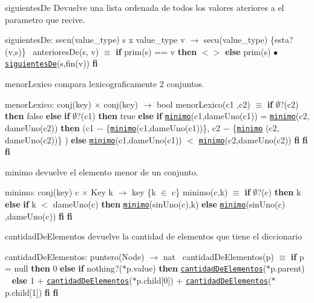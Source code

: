 \begin{DoxyParagraph}{siguientes\+De}
Devuelve una lista ordenada de todos los valores ateriores a el parametro que recive.

siguientes\+De\+: secu(value\+\_\+type) s x value\+\_\+type v $\to$ secu(value\+\_\+type) \{esta?(v,s)\}~\newline
 anteriores\+De(s, v) $\equiv$ {\bfseries if} prim(s) == v {\bfseries then} $<$$>$ {\bfseries else} prim(s) $\bullet$ \href{axiomas.html#siguientesDe}{\tt siguientes\+De}(s,fin(v)) {\bfseries fi} 
\end{DoxyParagraph}


\begin{DoxyParagraph}{menor\+Lexico}
compara lexicograficamente 2 conjuntos.

menor\+Lexico\+: conj(key) $\times$ conj(key) $\to$ bool menor\+Lexico(c1 ,c2) $\equiv$ {\bfseries if} $\emptyset$?(c2) {\bfseries then} false {\bfseries else} {\bfseries if} $\emptyset$?(c1) {\bfseries then} true {\bfseries else} {\bfseries if} \href{axiomas.html#minimo}{\tt minimo}(c1,dame\+Uno(c1)) = \href{axiomas.html#minimo}{\tt minimo}(c2, dame\+Uno(c2)) {\bfseries then} (c1 $-$ \{\href{axiomas.html#minimo}{\tt minimo}(c1,dame\+Uno(c1))\}, c2 $-$ \{\href{axiomas.html#minimo}{\tt minimo} (c2, dame\+Uno(c2))\} ) {\bfseries else} \href{axiomas.html#minimo}{\tt minimo}(c1,dame\+Uno(c1)) $<$ \href{axiomas.html#minimo}{\tt minimo}(c2,dame\+Uno(c2)) {\bfseries fi} {\bfseries fi} {\bfseries fi} 
\end{DoxyParagraph}


\begin{DoxyParagraph}{minimo}
devuelve el elemento menor de un conjunto.

minimo\+: conj(key) c $\times$ Key k $\to$ key \{k $\in$ c\} minimo(c,k) $\equiv$ {\bfseries if} $\emptyset$?(c) {\bfseries then} k {\bfseries else} {\bfseries if} k $<$ dame\+Uno(c) {\bfseries then} \href{axiomas.html#minimo}{\tt minimo}(sin\+Uno(c),k) {\bfseries else} \href{axiomas.html#minimo}{\tt minimo}(sin\+Uno(c) ,dame\+Uno(c)) {\bfseries fi} {\bfseries fi} 
\end{DoxyParagraph}


\begin{DoxyParagraph}{cantidad\+De\+Elementos}
devuelve la cantidad de elementos que tiene el diccionario

cantidad\+De\+Elementos\+: puntero(\+Node) $\to$ nat~\newline
 cantidad\+De\+Elementos(p) $\equiv$ {\bfseries if} p = null {\bfseries then} 0 {\bfseries else} {\bfseries if} nothing?($\ast$p.value) {\bfseries then} \href{axiomas.html#cantidadDeElementos}{\tt cantidad\+De\+Elementos}($\ast$p.parent) ~\newline
 {\bfseries else} 1 + \href{axiomas.html#cantidadDeElementos}{\tt cantidad\+De\+Elementos}($\ast$p.child\mbox{[}0\mbox{]}) + \href{axiomas.html#cantidadDeElementos}{\tt cantidad\+De\+Elementos}($\ast$p.child\mbox{[}1\mbox{]}) {\bfseries fi} {\bfseries fi} 
\end{DoxyParagraph}


